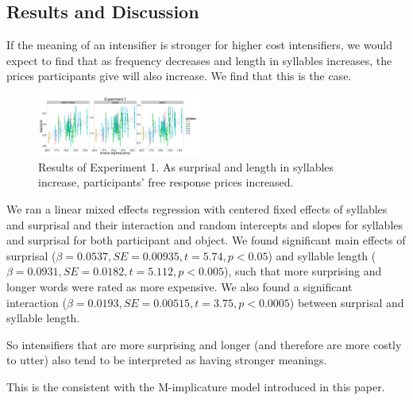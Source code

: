 \documentclass[10pt,letterpaper]{article}
\newcommand{\todo}[1]{{\color{red}#1}}
\begin{document}
\subsection{Results and Discussion}

If the meaning of an intensifier is stronger for higher cost intensifiers, we would expect to find that as frequency decreases and length in syllables increases, the prices participants give will also increase. We find that this is the case.

\begin{figure}[ht]
\begin{center}
\includegraphics[width=0.48\textwidth]{analysis_files_for_writeup/images/exp1-plot.png}
\end{center}
\caption{Results of Experiment 1. As surprisal and length in syllables increase, participants' free response prices increased.} 
\label{exp1-plot}
\end{figure}

We ran a linear mixed effects regression with centered fixed effects of syllables and surprisal and their interaction and random intercepts and slopes for syllables and surprisal for both participant and object.
We found significant main effects of surprisal ($\beta=0.0537, SE=0.00935, t=5.74, p<0.05$) and syllable length ($\beta=0.0931, SE=0.0182, t=5.112, p<0.005$), such that more surprising and longer words were rated as more expensive. We also found a significant interaction ($\beta=0.0193, SE=0.00515, t=3.75, p<0.0005$) between surprisal and syllable length.%

So intensifiers that are more surprising and longer (and therefore are more costly to utter) also tend to be interpreted as having stronger meanings.

This is the consistent with the M-implicature model introduced in this paper.
\end{document}
